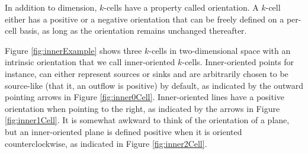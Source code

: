 In addition to dimension, $k$-cells have a property called orientation. A $k$-cell either has a positive or a negative orientation that can be freely defined on a per-cell basis, as long as the orientation remains unchanged thereafter. 

Figure \ref{fig:innerExample} shows three $k$-cells in two-dimensional space with an intrinsic orientation that we call inner-oriented $k$-cells. Inner-oriented points for instance, can either represent sources or sinks and are arbitrarily chosen to be source-like (that it, an outflow is positive) by default, as indicated by the outward pointing arrows in Figure \ref{fig:inner0Cell}. Inner-oriented lines have a positive orientation when pointing to the right, as indicated by the arrows in Figure \ref{fig:inner1Cell}. It is somewhat awkward to think of the orientation of a plane, but an inner-oriented plane is defined positive when it is oriented counterclockwise, as indicated in Figure \ref{fig:inner2Cell}.

